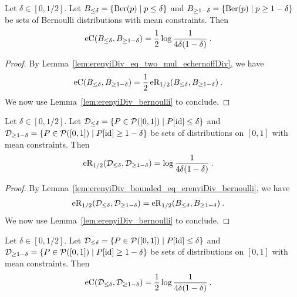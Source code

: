 \begin{lemma}\label{lem:echernoffDiv_bernoulli}
  \leanok
Let $\delta \in [0,1/2]$.
Let $B_{\le \delta} = \{\operatorname{Ber}(p) \mid p \le \delta\}$ and $B_{\ge 1 - \delta} = \{\operatorname{Ber}(p) \mid p \ge 1 - \delta\}$ be sets of Bernoulli distributions with mean constraints.
Then
\begin{align*}
  \operatorname{eC}(B_{\le \delta}, B_{\ge 1 - \delta})
  &= \frac{1}{2} \log \frac{1}{4 \delta (1 - \delta)}
  \: .
\end{align*}
\end{lemma}

\begin{proof}\leanok
By Lemma~\ref{lem:erenyiDiv_eq_two_mul_echernoffDiv}, we have
\begin{align*}
  \operatorname{eC}(B_{\le \delta}, B_{\ge 1 - \delta})
  &= \frac{1}{2} \operatorname{eR}_{1/2}(B_{\le \delta}, B_{\ge 1 - \delta})
  \: .
\end{align*}
We now use Lemma~\ref{lem:erenyiDiv_bernoulli} to conclude.
\end{proof}


\begin{lemma}\label{lem:erenyiDiv_bounded}
  \leanok
Let $\delta \in [0,1/2]$.
Let $\mathcal{D}_{\le \delta} = \{P \in \mathcal{P}([0,1]) \mid P[\operatorname{id}] \le \delta\}$ and $\mathcal{D}_{\ge 1 - \delta} = \{P \in \mathcal{P}([0,1]) \mid P[\operatorname{id}] \ge 1 - \delta\}$ be sets of distributions on $[0,1]$ with mean constraints.
Then
\begin{align*}
  \operatorname{eR}_{1/2}(\mathcal{D}_{\le \delta}, \mathcal{D}_{\ge 1 - \delta})
  &= \log \frac{1}{4 \delta (1 - \delta)}
  \: .
\end{align*}
\end{lemma}

\begin{proof}\leanok
By Lemma~\ref{lem:erenyiDiv_bounded_eq_erenyiDiv_bernoulli}, we have
\begin{align*}
  \operatorname{eR}_{1/2}(\mathcal{D}_{\le \delta}, \mathcal{D}_{\ge 1 - \delta})
  &= \operatorname{eR}_{1/2}(B_{\le \delta}, B_{\ge 1 - \delta})
  \: .
\end{align*}
We now use Lemma~\ref{lem:erenyiDiv_bernoulli} to conclude.
\end{proof}


\begin{lemma}\label{lem:echernoffDiv_bounded}
  \leanok
Let $\delta \in [0,1/2]$.
Let $\mathcal{D}_{\le \delta} = \{P \in \mathcal{P}([0,1]) \mid P[\operatorname{id}] \le \delta\}$ and $\mathcal{D}_{\ge 1 - \delta} = \{P \in \mathcal{P}([0,1]) \mid P[\operatorname{id}] \ge 1 - \delta\}$ be sets of distributions on $[0,1]$ with mean constraints.
Then
\begin{align*}
  \operatorname{eC}(\mathcal{D}_{\le \delta}, \mathcal{D}_{\ge 1 - \delta})
  &= \frac{1}{2} \log \frac{1}{4 \delta (1 - \delta)}
  \: .
\end{align*}
\end{lemma}

